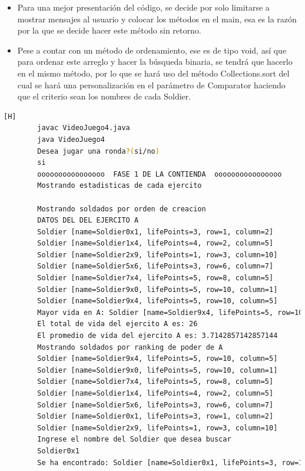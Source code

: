 \documentclass{article}
\begin{document}
	\begin{itemize}	
		\item Para una mejor presentación del código, se decide por solo limitarse a mostrar mensajes al usuario y colocar los métodos en el main, esa es la razón por la que se decide hacer este método sin retorno.
		\item  Pese a contar con un método de ordenamiento, ese es de tipo void, así que  para ordenar este arreglo y hacer la búsqueda binaria, se tendrá que hacerlo en el mismo método, por lo que se hará uso del método Collections.sort del cual se hará una personalización en el parámetro de Comparator haciendo que el criterio sean los nombres de cada Soldier.
	\end{itemize}
	
	\begin{lstlisting}[language=bash,caption={Compilando y probando  }][H]
		javac VideoJuego4.java
		java VideoJuego4
		Desea jugar una ronda?(si/no)
		si
		oooooooooooooooo  FASE 1 DE LA CONTIENDA  oooooooooooooooo
		Mostrando estadisticas de cada ejercito
		
		Mostrando soldados por orden de creacion
		DATOS DEL DEL EJERCITO A
		Soldier [name=Soldier0x1, lifePoints=3, row=1, column=2]
		Soldier [name=Soldier1x4, lifePoints=4, row=2, column=5]
		Soldier [name=Soldier2x9, lifePoints=1, row=3, column=10]
		Soldier [name=Soldier5x6, lifePoints=3, row=6, column=7]
		Soldier [name=Soldier7x4, lifePoints=5, row=8, column=5]
		Soldier [name=Soldier9x0, lifePoints=5, row=10, column=1]
		Soldier [name=Soldier9x4, lifePoints=5, row=10, column=5]
		Mayor vida en A: Soldier [name=Soldier9x4, lifePoints=5, row=10, column=5]
		El total de vida del ejercito A es: 26
		El promedio de vida del ejercito A es: 3.7142857142857144
		Mostrando soldados por ranking de poder de A
		Soldier [name=Soldier9x4, lifePoints=5, row=10, column=5]
		Soldier [name=Soldier9x0, lifePoints=5, row=10, column=1]
		Soldier [name=Soldier7x4, lifePoints=5, row=8, column=5]
		Soldier [name=Soldier1x4, lifePoints=4, row=2, column=5]
		Soldier [name=Soldier5x6, lifePoints=3, row=6, column=7]
		Soldier [name=Soldier0x1, lifePoints=3, row=1, column=2]
		Soldier [name=Soldier2x9, lifePoints=1, row=3, column=10]
		Ingrese el nombre del Soldier que desea buscar
		Soldier0x1
		Se ha encontrado: Soldier [name=Soldier0x1, lifePoints=3, row=1, column=2]
		

\end{lstlisting}
\end{document}
